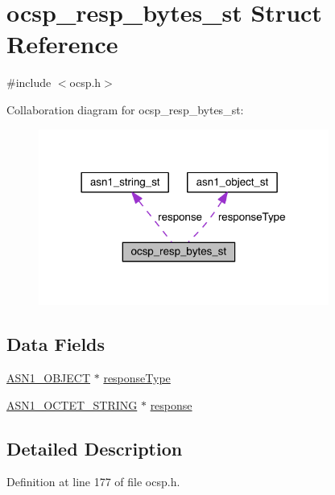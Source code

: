 \hypertarget{structocsp__resp__bytes__st}{}\section{ocsp\+\_\+resp\+\_\+bytes\+\_\+st Struct Reference}
\label{structocsp__resp__bytes__st}


{\ttfamily \#include $<$ocsp.\+h$>$}



Collaboration diagram for ocsp\+\_\+resp\+\_\+bytes\+\_\+st\+:\nopagebreak
\begin{figure}[H]
\begin{center}
\leavevmode
\includegraphics[width=270pt]{structocsp__resp__bytes__st__coll__graph}
\end{center}
\end{figure}
\subsection*{Data Fields}
\begin{DoxyCompactItemize}
\item 
\hyperlink{crypto_2ossl__typ_8h_ae3fda0801e4c8e250087052bafb3ce2e}{A\+S\+N1\+\_\+\+O\+B\+J\+E\+CT} $\ast$ \hyperlink{structocsp__resp__bytes__st_ac770e491617844444e32c19cce7d230f}{response\+Type}
\item 
\hyperlink{crypto_2ossl__typ_8h_afbd05e94e0f0430a2b729473efec88c1}{A\+S\+N1\+\_\+\+O\+C\+T\+E\+T\+\_\+\+S\+T\+R\+I\+NG} $\ast$ \hyperlink{structocsp__resp__bytes__st_a3ed5d29c142420cadf1386ab349d07fe}{response}
\end{DoxyCompactItemize}


\subsection{Detailed Description}


Definition at line 177 of file ocsp.\+h.



